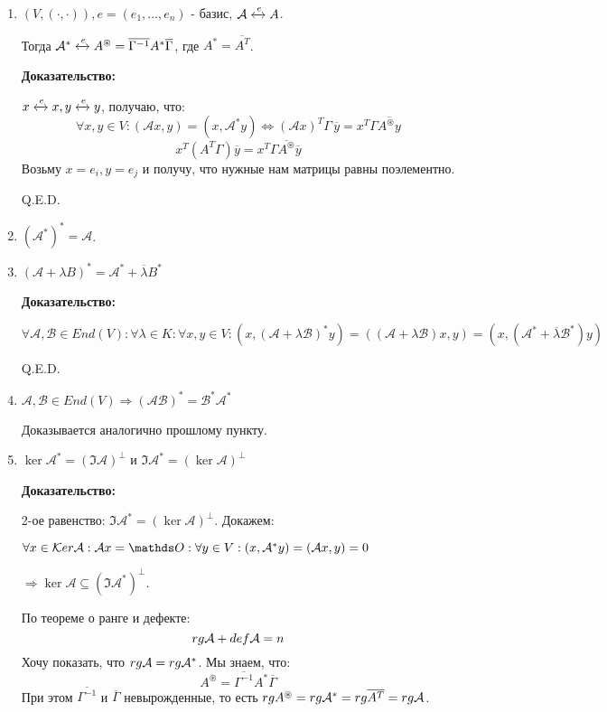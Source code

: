 \begin{enumerate}

\item $(V, (\cdot, \cdot)), e= (e_1,\ldots, e_n)$ - базис, $\mathcal{A} \xleftrightarrow{e} A$.

Тогда $\mathcal{A}^* \xleftrightarrow{e} A^\circledast = \overline{\Gamma^{-1}} A^* \overline{\Gamma}$, где $A^* = \overline{A^T}$.

\textbf{Доказательство:}

$x \xleftrightarrow{e}x, y \xleftrightarrow{e}y$, получаю, что:
$$\forall x,y \in V: (\mathcal{A}x,y) = (x, \mathcal{A}^* y) \Leftrightarrow (\mathcal{A}x)^T \Gamma\, \overline{y} = x^T \Gamma \overline{A^\circledast y} $$
$$x^T (A^T \Gamma)\overline{y}=x^T \Gamma \overline{A^\circledast}\overline{y}$$
Возьму $x = e_i, y= e_j$ и получу, что нужные нам матрицы равны поэлементно.

\hfill Q.E.D.

\item $(\mathcal{A}^*)^* = \mathcal{\mathcal{A}} $.
\item  $(\mathcal{A} + \lambda B)^* = \mathcal{A}^* +\overline{ \lambda} B^*$

\textbf{Доказательство:}

$\forall \mathcal{A}, \mathcal{B}\in End(V):\forall \lambda \in K:\forall x,y \in V: (x, (\mathcal{A } + \lambda \mathcal{B})^* y) = ((\mathcal{A} + \lambda \mathcal{B})x, y)= (x, (\mathcal{A}^* +\overline{\lambda}\mathcal{B}^* )y)$

\hfill Q.E.D.

\item $\mathcal{A}, \mathcal{B}\in End(V) \Rightarrow (\mathcal{A}\mathcal{B})^* = \mathcal{B}^* \mathcal{A}^*$

Доказывается аналогично прошлому пункту.

\item $\ker \mathcal{A}^* = (\Im \mathcal{A})^\perp$ и $\Im \mathcal{A}^* = (\ker \mathcal{A})^\perp$

\textbf{Доказательство:}

2-ое равенство: $\Im \mathcal{A}^* = (\ker \mathcal{A})^\perp$. Докажем:

$\forall x \in \ker \mathcal{A}: \mathcal{A}x = \zero : \forall y \in V: (x, \mathcal{A}^*y) = (\mathcal{A}x,y)=0$

$\Rightarrow \ker \mathcal{A} \subseteq (\Im \mathcal{A}^*)^\perp$.

По теореме о ранге и дефекте:
$$rg \mathcal{A} + def \mathcal{A} = n$$
Хочу показать, что $rg \mathcal{A} = rg \mathcal{A}^*$. Мы знаем, что:
$$A^\circledast = \overline{\Gamma^{-1}}A^* \overline{\Gamma^{}}$$
При этом $\overline{\Gamma^{-1}}$ и $\overline{\Gamma}$ невырожденные, то есть $rg A^\circledast = rg \mathcal{A}^* = rg \overline{A^T} = rg \mathcal{A}$.


\end{enumerate}
